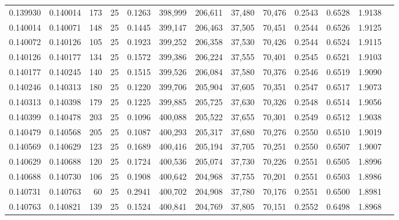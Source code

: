 \begin{tabular}{rrrrrrrrrrrrr}
0.139930 & 0.140014 &   173 &  25 &                                     0.1263 & 398,999 & 206,611 &  37,480 &  70,476 & 0.2543 & 0.6528 & 1.9138 \\
0.140014 & 0.140071 &   148 &  25 &                                     0.1445 & 399,147 & 206,463 &  37,505 &  70,451 & 0.2544 & 0.6526 & 1.9125 \\
0.140072 & 0.140126 &   105 &  25 &                                     0.1923 & 399,252 & 206,358 &  37,530 &  70,426 & 0.2544 & 0.6524 & 1.9115 \\
0.140126 & 0.140177 &   134 &  25 &                                     0.1572 & 399,386 & 206,224 &  37,555 &  70,401 & 0.2545 & 0.6521 & 1.9103 \\
0.140177 & 0.140245 &   140 &  25 &                                     0.1515 & 399,526 & 206,084 &  37,580 &  70,376 & 0.2546 & 0.6519 & 1.9090 \\
0.140246 & 0.140313 &   180 &  25 &                                     0.1220 & 399,706 & 205,904 &  37,605 &  70,351 & 0.2547 & 0.6517 & 1.9073 \\
0.140313 & 0.140398 &   179 &  25 &                                     0.1225 & 399,885 & 205,725 &  37,630 &  70,326 & 0.2548 & 0.6514 & 1.9056 \\
0.140399 & 0.140478 &   203 &  25 &                                     0.1096 & 400,088 & 205,522 &  37,655 &  70,301 & 0.2549 & 0.6512 & 1.9038 \\
0.140479 & 0.140568 &   205 &  25 &                                     0.1087 & 400,293 & 205,317 &  37,680 &  70,276 & 0.2550 & 0.6510 & 1.9019 \\
0.140569 & 0.140629 &   123 &  25 &                                     0.1689 & 400,416 & 205,194 &  37,705 &  70,251 & 0.2550 & 0.6507 & 1.9007 \\
0.140629 & 0.140688 &   120 &  25 &                                     0.1724 & 400,536 & 205,074 &  37,730 &  70,226 & 0.2551 & 0.6505 & 1.8996 \\
0.140688 & 0.140730 &   106 &  25 &                                     0.1908 & 400,642 & 204,968 &  37,755 &  70,201 & 0.2551 & 0.6503 & 1.8986 \\
0.140731 & 0.140763 &    60 &  25 &                                     0.2941 & 400,702 & 204,908 &  37,780 &  70,176 & 0.2551 & 0.6500 & 1.8981 \\
0.140763 & 0.140821 &   139 &  25 &                                     0.1524 & 400,841 & 204,769 &  37,805 &  70,151 & 0.2552 & 0.6498 & 1.8968 \\

\end{tabular}
